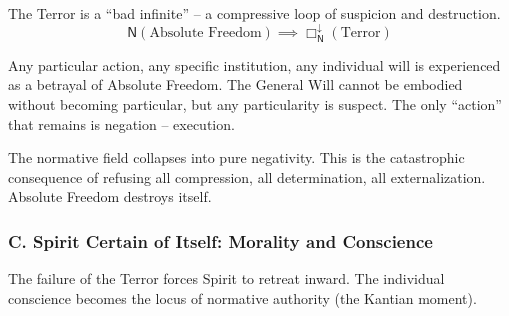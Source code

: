 \documentclass[12pt]{book}
\newcommand{\NBoxDown}{\Box_{\mathsf{N}}^{\downarrow}}
\begin{document}
\begin{enumerate}
The Terror is a ``bad infinite'' -- a compressive loop of suspicion and destruction.
\[
\mathsf{N}(\text{Absolute Freedom}) \implies \NBoxDown(\text{Terror})
\]

Any particular action, any specific institution, any individual will is experienced as a betrayal of Absolute Freedom. The General Will cannot be embodied without becoming particular, but any particularity is suspect. The only ``action'' that remains is negation -- execution.

The normative field collapses into pure negativity. This is the catastrophic consequence of refusing all compression, all determination, all externalization. Absolute Freedom destroys itself.
\end{enumerate}

\subsubsection{C. Spirit Certain of Itself: Morality and Conscience}

The failure of the Terror forces Spirit to retreat inward. The individual conscience becomes the locus of normative authority (the Kantian moment).
\end{document}
